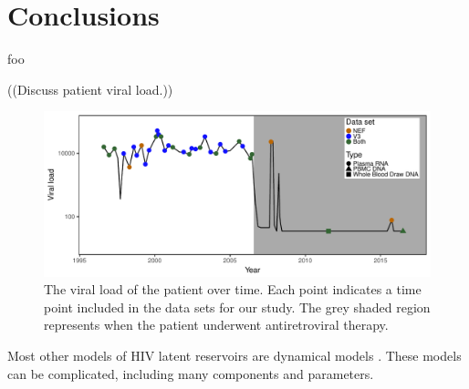 \documentclass[9pt,twocolumn,twoside,lineno]{pnas-new}
\begin{document}
\section*{Conclusions}
foo

((Discuss patient viral load.))

\begin{figure}
\includegraphics{VL}
\caption{The viral load of the patient over time.
Each point indicates a time point included in the data sets for our study.
The grey shaded region represents when the patient underwent antiretroviral therapy.
}
\label{fig:viralload}
\end{figure}

Most other models of HIV latent reservoirs are dynamical models \cite{Rong09,Pace11}. These models can be complicated, including many components and parameters.
\end{document}
